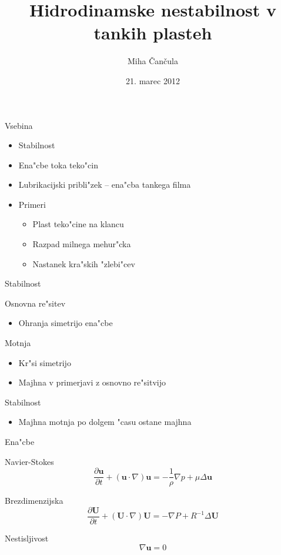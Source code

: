\documentclass{beamer}
\date{21. marec 2012}
\title{Hidrodinamske nestabilnost v tankih plasteh}
\author{Miha \v Can\v cula}
\renewcommand{\vec}{\mathbf}
\begin{document}
\frame{\titlepage}

\begin{frame}{Vsebina}
 \begin{itemize}
  \item Stabilnost
  \item Ena"cbe toka teko"cin
  \item Lubrikacijski pribli"zek -- ena"cba tankega filma
  \item Primeri
  \begin{itemize}
    \item{Plast teko"cine na klancu}
    \item{Razpad milnega mehur"cka}
    \item{Nastanek kra"skih "zlebi"cev}
  \end{itemize}
 \end{itemize}
\end{frame}


\begin{frame}{Stabilnost}
\begin{block}{Osnovna re"sitev}
 \begin{itemize}
  \item Ohranja simetrijo ena"cbe
 \end{itemize}
\end{block}

\begin{block}{Motnja}
 \begin{itemize}
 \item Kr"si simetrijo
 \item Majhna v primerjavi z osnovno re"sitvijo
 \end{itemize}
 \end{block}
 
 \begin{block}{Stabilnost}
 \begin{itemize}
  \item Majhna motnja po dolgem "casu ostane majhna
 \end{itemize}
 \end{block}

\end{frame}

\begin{frame}{Ena"cbe}

\begin{block}{Navier-Stokes}
\[ \frac{\partial \vec u}{\partial t} + (\vec u \cdot \nabla) \vec u = -\frac{1}{\rho}\nabla p + \mu \Delta \vec u \] 
\end{block}
\begin{block}{Brezdimenzijska}
\[ \frac{\partial \vec U}{\partial t} + (\vec U \cdot \nabla) \vec U = -\nabla P + R^{-1}\Delta \vec U \] 
\end{block}
\begin{block}{Nestisljivost}
\[ \nabla \vec u = 0 \]
\end{block}

\end{frame}
\end{document}
